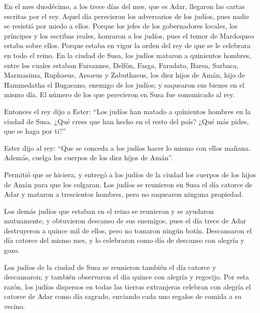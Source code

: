  En el mes duodécimo, a los trece días del mes, que es
Adar, llegaron las cartas escritas por el rey.  Aquel día
perecieron los adversarios de los judíos, pues nadie se resistió por
miedo a ellos.  Porque los jefes de los gobernadores
locales, los príncipes y los escribas reales, honraron a los judíos,
pues el temor de Mardoqueo estaba sobre ellos.  Porque
estaba en vigor la orden del rey de que se le celebrara en todo el
reino.  En la ciudad de Susa, los judíos mataron a
quinientos hombres,  entre los cuales estaban Farsannes,
Delfón, Fasga,  Faradato, Barea, Sarbaca, 
Marmasima, Ruphaeus, Arsaeus y Zabuthaeus,  los diez
hijos de Amán, hijo de Hammedatha el Bugaeano, enemigo de los judíos; y
saquearon sus bienes en el mismo día.  El número de los
que perecieron en Susa fue comunicado al rey.

 Entonces el rey dijo a Ester: ``Los judíos han matado a
quinientos hombres en la ciudad de Susa. ¿Qué crees que han hecho en el
resto del país? ¿Qué más pides, que se haga por ti?''

 Ester dijo al rey: ``Que se conceda a los judíos hacer
lo mismo con ellos mañana. Además, cuelga los cuerpos de los diez hijos
de Amán''.

 Permitió que se hiciera, y entregó a los judíos de la
ciudad los cuerpos de los hijos de Amán para que los colgaran.
 Los judíos se reunieron en Susa el día catorce de Adar y
mataron a trescientos hombres, pero no saquearon ninguna propiedad.

 Los demás judíos que estaban en el reino se reunieron y
se ayudaron mutuamente, y obtuvieron descanso de sus enemigos, pues el
día trece de Adar destruyeron a quince mil de ellos, pero no tomaron
ningún botín.  Descansaron el día catorce del mismo mes,
y lo celebraron como día de descanso con alegría y gozo.

 Los judíos de la ciudad de Susa se reunieron también el
día catorce y descansaron; y también observaron el día quince con
alegría y regocijo.  Por esta razón, los judíos dispersos
en todas las tierras extranjeras celebran con alegría el catorce de Adar
como día sagrado, enviando cada uno regalos de comida a su vecino.


